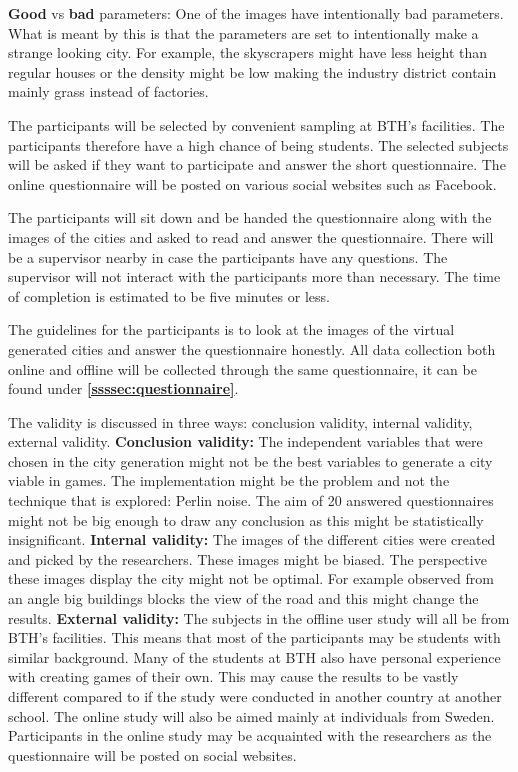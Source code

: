 			\textbf{Good} vs \textbf{bad} parameters: One of the images have intentionally bad parameters. What is meant by this is that the parameters are set to intentionally make a strange looking city. For example, the skyscrapers might have less height than regular houses or the density might be low making the industry district contain mainly grass instead of factories.
			
			The participants will be selected by convenient sampling at BTH’s facilities. The participants therefore have a high chance of being students. The selected subjects will be asked if they want to participate and answer the short questionnaire.
			The online questionnaire will be posted on various social websites such as Facebook.
			
			The participants will sit down and be handed the questionnaire along with the images of the cities and asked to read and answer the questionnaire. There will be a supervisor nearby in case the participants have any questions. The supervisor will not interact with the participants more than necessary.  The time of completion is estimated to be five minutes or less.
			
			The guidelines for the participants is to look at the images of the virtual generated cities and answer the questionnaire honestly. All data collection both online and offline will be collected through the same questionnaire, it can be found under \textbf{\ref{ssssec:questionnaire}}.
			
			The validity is discussed in three ways: conclusion validity, internal validity, external validity. \cite{ExperimentationInSoftware}
			\textbf{Conclusion validity:} The independent variables that were chosen in the city generation might not be the best variables to generate a city viable in games. The implementation might be the problem and not the technique that is explored: Perlin noise. The aim of 20 answered questionnaires might not be big enough to draw any conclusion as this might be statistically insignificant.
			\textbf{Internal validity:} The images of the different cities were created and picked by the researchers. These images might be biased. The perspective these images display the city might not be optimal. For example observed from an angle big buildings blocks the view of the road and this might change the results.
			\textbf{External validity:} The subjects in the offline user study will all be from BTH’s facilities. This means that most of the participants may be students with similar background. Many of the students at BTH also have personal experience with creating games of their own. This may cause the results to be vastly different compared to if the study were conducted in another country at another school. The online study will also be aimed mainly at individuals from Sweden. Participants in the online study may be acquainted with the researchers as the questionnaire will be posted on social websites.
			
